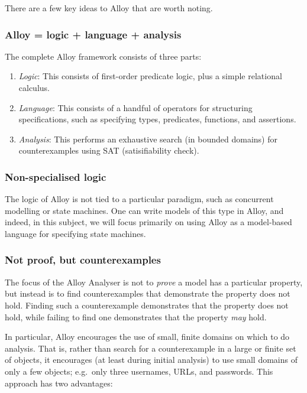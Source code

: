 There are a few key ideas to Alloy that are worth noting.

\subsubsection{Alloy = logic + language + analysis}

The complete Alloy framework consists of three parts:

\begin{enumerate}
 \item \emph{Logic}: This consists of first-order predicate logic, plus a simple relational calculus.
 \item \emph{Language}: This consists of a handful of operators for structuring specifications, such as specifying types, predicates, functions, and assertions.
 \item \emph{Analysis}: This performs an exhaustive search (in bounded domains) for counterexamples using SAT (satisifiability check).
\end{enumerate}


\subsubsection*{Non-specialised logic}

The logic of Alloy is not tied to a particular paradigm, such as concurrent modelling or state machines. One can write models of this type in Alloy, and indeed, in this subject, we will focus primarily on using Alloy as a model-based language for specifying state machines.

\subsubsection*{Not proof, but counterexamples}

The focus of the Alloy Analyser is not to \emph{prove} a model has a particular property, but instead is to find counterexamples that demonstrate the property does not hold. Finding such a counterexample demonstrates that the property does not hold, while failing to find one demonstrates that the property \emph{may} hold.

In particular, Alloy encourages the use of small, finite domains on which to do analysis. That is, rather than search for a counterexample in a large or finite set of objects, it encourages (at least during initial analysis) to use small domains of only a few objects; e.g.\ only three usernames, URLs, and passwords. This approach has two advantages:

